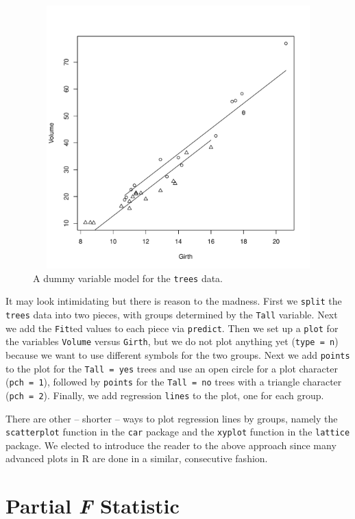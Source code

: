 \documentclass[captions=tableheading]{scrbook}
\begin{document}
\begin{figure}[ht!]
    \includegraphics[width=5in, height=4in]{img/dummy-variable-trees.pdf}
    \caption[A dummy variable model for the \texttt{trees} data]{\small A dummy variable model for the \texttt{trees} data.}
    \label{fig:dummy-variable-trees}
  \end{figure}

It may look intimidating but there is reason to the madness. First we \texttt{split} the \texttt{trees} data into two pieces, with groups determined by the \texttt{Tall} variable. Next we add the \texttt{Fit}ted values to each piece via \texttt{predict}. Then we set up a \texttt{plot} for the variables \texttt{Volume} versus \texttt{Girth}, but we do not plot anything yet (\texttt{type = n}) because we want to use different symbols for the two groups. Next we add \texttt{points} to the plot for the \texttt{Tall = yes} trees and use an open circle for a plot character (\texttt{pch = 1}), followed by \texttt{points} for the \texttt{Tall = no} trees with a triangle character (\texttt{pch = 2}). Finally, we add regression \texttt{lines} to the plot, one for each group.

There are other -- shorter -- ways to plot regression lines by groups, namely the \texttt{scatterplot} function in the \texttt{car} \cite{car} package and the \texttt{xyplot} function in the \texttt{lattice} package. We elected to introduce the reader to the above approach since many advanced plots in \textsf{R} are done in a similar, consecutive fashion.
\section{Partial \emph{F} Statistic}
\label{sec-1-7}
\end{document}
